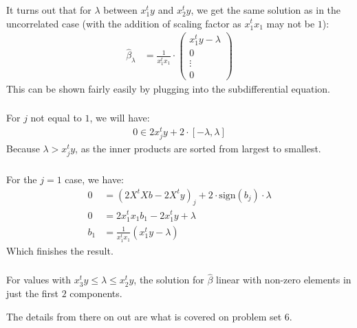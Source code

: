 \begin{frame}[fragile] \frametitle{}

It turns out that for $\lambda$ between $x_1^t y$ and
$x_2^t y$, we get the same solution as in the uncorrelated
case (with the addition of scaling factor as $x_1^t x_1$ may
not be $1$):
\begin{align*}
\widehat{\beta}_\lambda &= \frac{1}{x^t_1 x_1} \cdot \left(\begin{array}{c}
x_1^t y - \lambda \\
0\\
\vdots\\
0
\end{array} \right)
\end{align*}
This can be shown fairly easily by plugging into the subdifferential
equation.

\end{frame}

\begin{frame}[fragile] \frametitle{}

For $j$ not equal to $1$, we will have:
\begin{align*}
0 \in 2 x_j^t y + 2\cdot[-\lambda,\lambda]
\end{align*}
Because $\lambda > x_j^t y$, as the inner products are sorted from
largest to smallest.

\end{frame}

\begin{frame}[fragile] \frametitle{}

For the $j=1$ case, we have:
\begin{align*}
0 &= \left(2 X^t X b - 2 X^t y\right)_{j} + 2\cdot \text{sign}(b_j)\cdot\lambda \\
0 &= 2 x^t_1 x_1 b_1 - 2 x_1^t y + \lambda \\
b_1 &= \frac{1}{x^t_1 x_1} \left( x_1^t y - \lambda \right)
\end{align*}
Which finishes the result.

\end{frame}


\begin{frame}[fragile] \frametitle{}

For values with $x_3^t y \leq \lambda \leq x_2^t y$, the solution
for $\widehat{\beta}$ linear with non-zero elements in just the
first $2$ components.

\pause The details from there on out are what is covered on problem
set $6$.

\end{frame}

